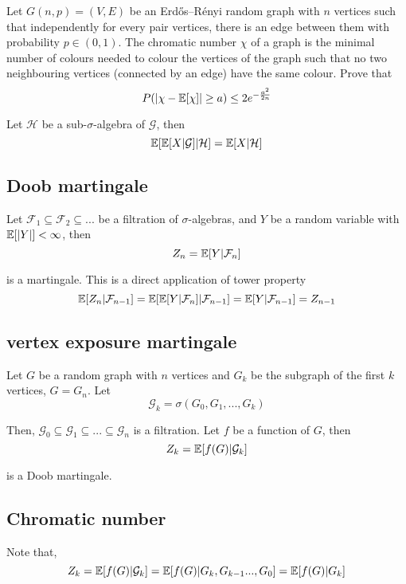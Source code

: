 \documentclass{article}
\begin{document}
Let $G(n, p) = (V, E)$ be an Erdős–Rényi random graph with $n$ vertices such that independently for every pair vertices, there is an edge between them with probability $p \in (0, 1)$. The chromatic number $\chi$ of a graph is the minimal number of colours needed to colour the vertices of the graph such that no two neighbouring vertices (connected by an edge) have the same colour. Prove that
$$
	P(|\chi - \mathbb{E}[\chi]| \geq a) \leq 2 e^{- \frac{a^2}{2n}}
$$

\begin{proposition}
	Let $\mathcal{H}$ be a sub-$\sigma$-algebra of $\mathcal{G}$, then
	$$
		\mathbb{E}[\mathbb{E}[X | \mathcal{G}] | \mathcal{H}] = \mathbb{E}[X | \mathcal{H}]
	$$
\end{proposition}

\subsection{Doob martingale}

Let $\mathcal{F}_1 \subseteq \mathcal{F}_2 \subseteq ...$ be a filtration of $\sigma$-algebras, and $Y$ be a random variable with $\mathbb{E}[|Y|] < \infty$, then
$$
	Z_n = \mathbb{E}[Y | \mathcal{F}_n]
$$

is a martingale. This is a direct application of tower property
$$
	\mathbb{E}[Z_n | \mathcal{F}_{n-1}] =  \mathbb{E}[\mathbb{E}[Y | \mathcal{F}_n] | \mathcal{F}_{n-1}] = \mathbb{E}[Y | \mathcal{F}_{n-1}] = Z_{n-1}
$$

\subsection{vertex exposure martingale}

Let $G$ be a random graph with $n$ vertices and $G_k$ be the subgraph of the first $k$ vertices, $G = G_n$. Let
$$
	\mathcal{G}_k = \sigma(G_0, G_1, ..., G_k)
$$

Then, $\mathcal{G}_0 \subseteq \mathcal{G}_1 \subseteq ... \subseteq \mathcal{G}_n$ is a filtration. Let $f$ be a function of $G$, then 
$$
	Z_k = \mathbb{E}[f(G) | \mathcal{G}_k]
$$

is a Doob martingale.

\subsection{Chromatic number}

Note that, 
$$
	Z_k = \mathbb{E}[f(G) | \mathcal{G}_k] = \mathbb{E}[f(G) | G_k, G_{k-1} ..., G_0]  = \mathbb{E}[f(G) | G_k]
$$
 
\end{document}
